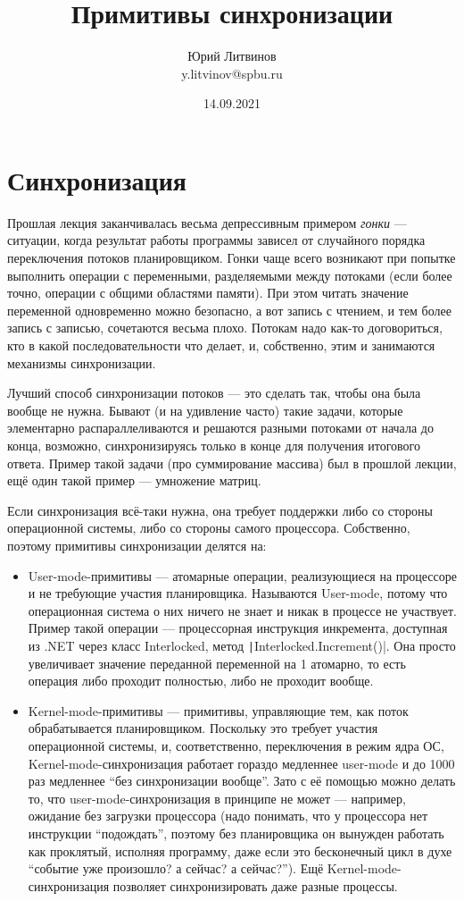 \documentclass[a5paper]{article}
\title{Примитивы синхронизации}
\author{Юрий Литвинов\\\small{y.litvinov@spbu.ru}}
\date{14.09.2021}
\begin{document}
\maketitle
\thispagestyle{empty}

\section{Синхронизация}

Прошлая лекция заканчивалась весьма депрессивным примером \textit{гонки} --- ситуации, когда результат работы программы зависел от случайного порядка переключения потоков планировщиком. Гонки чаще всего возникают при попытке выполнить операции с переменными, разделяемыми между потоками (если более точно, операции с общими областями памяти). При этом читать значение переменной одновременно можно безопасно, а вот запись с чтением, и тем более запись с записью, сочетаются весьма плохо. Потокам надо как-то договориться, кто в какой последовательности что делает, и, собственно, этим и занимаются механизмы синхронизации.

Лучший способ синхронизации потоков --- это сделать так, чтобы она была вообще не нужна. Бывают (и на удивление часто) такие задачи, которые элементарно распараллеливаются и решаются разными потоками от начала до конца, возможно, синхронизируясь только в конце для получения итогового ответа. Пример такой задачи (про суммирование массива) был в прошлой лекции, ещё один такой пример --- умножение матриц.

Если синхронизация всё-таки нужна, она требует поддержки либо со стороны операционной системы, либо со стороны самого процессора. Собственно, поэтому примитивы синхронизации делятся на:

\begin{itemize}
    \item User-mode-примитивы --- атомарные операции, реализующиеся на процессоре и не требующие участия планировщика. Называются User-mode, потому что операционная система о них ничего не знает и никак в процессе не участвует. Пример такой операции --- процессорная инструкция инкремента, доступная из .NET через класс Interlocked, метод \texttt|Interlocked.Increment()|. Она просто увеличивает значение переданной переменной на 1 атомарно, то есть операция либо проходит полностью, либо не проходит вообще.
    \item Kernel-mode-примитивы --- примитивы, управляющие тем, как поток обрабатывается планировщиком. Поскольку это требует участия операционной системы, и, соответственно, переключения в режим ядра ОС, Kernel-mode-синхронизация работает гораздо медленнее user-mode и до 1000 раз медленнее ``без синхронизации вообще''. Зато с её помощью можно делать то, что user-mode-синхронизация в принципе не может --- например, ожидание без загрузки процессора (надо понимать, что у процессора нет инструкции ``подождать'', поэтому без планировщика он вынужден работать как проклятый, исполняя программу, даже если это бесконечный цикл в духе ``событие уже произошло? а сейчас? а сейчас?''). Ещё Kernel-mode-синхронизация позволяет синхронизировать даже разные процессы.
\end{itemize}
\end{document}
